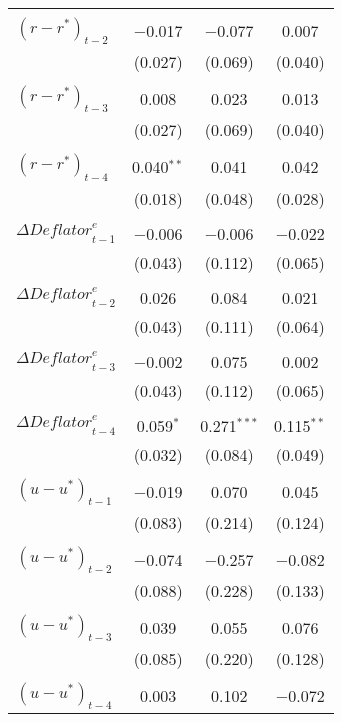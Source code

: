 \documentclass[11pt]{article}
\begin{document}
\begin{table}[!htbp]
\begin{threeparttable}
\begin{tabular}{@{\extracolsep{5pt}}lccc}
      & & & \\ 
      $\left(r-r^*\right)_{t-2}$ & $-$0.017 & $-$0.077 & 0.007 \\ 
      & (0.027) & (0.069) & (0.040) \\ 
      & & & \\ 
      $\left(r-r^*\right)_{t-3}$ & 0.008 & 0.023 & 0.013 \\ 
      & (0.027) & (0.069) & (0.040) \\ 
      & & & \\ 
      $\left(r-r^*\right)_{t-4}$ & 0.040$^{**}$ & 0.041 & 0.042 \\ 
      & (0.018) & (0.048) & (0.028) \\ 
      & & & \\ 
      $\Delta\mathit{Deflator}_{t-1}^e$ & $-$0.006 & $-$0.006 & $-$0.022 \\ 
      & (0.043) & (0.112) & (0.065) \\ 
      & & & \\ 
      $\Delta\mathit{Deflator}_{t-2}^e$ & 0.026 & 0.084 & 0.021 \\ 
      & (0.043) & (0.111) & (0.064) \\ 
      & & & \\ 
      $\Delta\mathit{Deflator}_{t-3}^e$ & $-$0.002 & 0.075 & 0.002 \\ 
      & (0.043) & (0.112) & (0.065) \\ 
      & & & \\ 
      $\Delta\mathit{Deflator}_{t-4}^e$ & 0.059$^{*}$ & 0.271$^{***}$ & 0.115$^{**}$ \\ 
      & (0.032) & (0.084) & (0.049) \\ 
      & & & \\ 
      $\left(u-u^*\right)_{t-1}$ & $-$0.019 & 0.070 & 0.045 \\ 
      & (0.083) & (0.214) & (0.124) \\ 
      & & & \\ 
      $\left(u-u^*\right)_{t-2}$ & $-$0.074 & $-$0.257 & $-$0.082 \\ 
      & (0.088) & (0.228) & (0.133) \\ 
      & & & \\ 
      $\left(u-u^*\right)_{t-3}$ & 0.039 & 0.055 & 0.076 \\ 
      & (0.085) & (0.220) & (0.128) \\ 
      & & & \\ 
      $\left(u-u^*\right)_{t-4}$ & 0.003 & 0.102 & $-$0.072 \\ 

\end{tabular}
\end{threeparttable}
\end{table}
\end{document}
